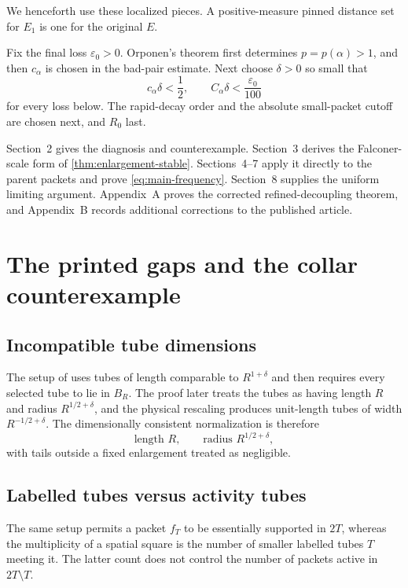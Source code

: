 \documentclass[11pt,letterpaper]{amsart}
\newcommand{\eps}{\varepsilon}
\begin{document}
We henceforth use these localized pieces.  A positive-measure pinned
distance set for \(E_1\) is one for the original \(E\).

Fix the final loss \(\eps_0>0\).  Orponen's theorem first determines
\(p=p(\alpha)>1\), and then \(c_\alpha\) is chosen in the bad-pair estimate.
Next choose \(\delta>0\) so small that
\[
 c_\alpha\delta<\frac12,\qquad
 C_\alpha\delta<\frac{\eps_0}{100}
\]
for every loss below.  The rapid-decay order and the absolute small-packet
cutoff are chosen next, and \(R_0\) last.

Section~2 gives the diagnosis and counterexample.  Section~3 derives the
Falconer-scale form of \cref{thm:enlargement-stable}.  Sections~4--7 apply it
directly to the parent packets and prove \cref{eq:main-frequency}.
Section~8 supplies the uniform limiting argument.  Appendix~A proves the
corrected refined-decoupling theorem, and Appendix~B records additional
corrections to the published article.

\section{The printed gaps and the collar counterexample}
\label{sec:gaps}

\subsection{Incompatible tube dimensions}

The setup of \cite[Theorem~4.2]{GIOW} uses tubes of length comparable to
\(R^{1+\delta}\) and then requires every selected tube to lie in \(B_R\).
The proof later treats the tubes as having length \(R\) and radius
\(R^{1/2+\delta}\), and the physical rescaling produces unit-length tubes
of width \(R^{-1/2+\delta}\).  The dimensionally consistent normalization is
therefore
\[
 \text{length }R,\qquad \text{radius }R^{1/2+\delta},
\]
with tails outside a fixed enlargement treated as negligible.

\subsection{Labelled tubes versus activity tubes}

The same setup permits a packet \(f_T\) to be essentially supported in
\(2T\), whereas the multiplicity of a spatial square is the number of
smaller labelled tubes \(T\) meeting it.  The latter count does not control
the number of packets active in \(2T\setminus T\).
\end{document}
